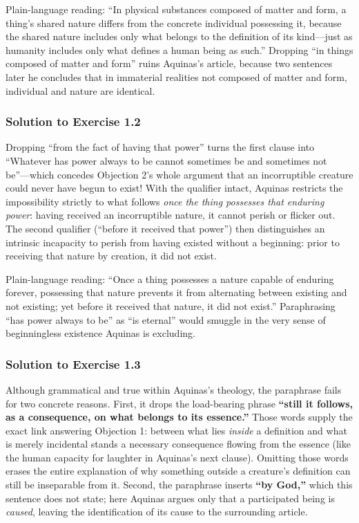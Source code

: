 Plain-language reading: ``In physical substances composed of matter and form, a thing's shared nature differs from the concrete individual possessing it, because the shared nature includes only what belongs to the definition of its kind---just as humanity includes only what defines a human being as such.'' Dropping ``in things composed of matter and form'' ruins Aquinas's article, because two sentences later he concludes that in immaterial realities not composed of matter and form, individual and nature are identical.

\subsubsection*{Solution to Exercise 1.2}
Dropping ``from the fact of having that power'' turns the first clause into ``Whatever has power always to be cannot sometimes be and sometimes not be''---which concedes Objection 2's whole argument that an incorruptible creature could never have begun to exist! With the qualifier intact, Aquinas restricts the impossibility strictly to what follows \emph{once the thing possesses that enduring power}: having received an incorruptible nature, it cannot perish or flicker out. The second qualifier (``before it received that power'') then distinguishes an intrinsic incapacity to perish from having existed without a beginning: prior to receiving that nature by creation, it did not exist.

Plain-language reading: ``Once a thing possesses a nature capable of enduring forever, possessing that nature prevents it from alternating between existing and not existing; yet before it received that nature, it did not exist.'' Paraphrasing ``has power always to be'' as ``is eternal'' would smuggle in the very sense of beginningless existence Aquinas is excluding.

\subsubsection*{Solution to Exercise 1.3}
Although grammatical and true within Aquinas's theology, the paraphrase fails for two concrete reasons. First, it drops the load-bearing phrase \textbf{``still it follows, as a consequence, on what belongs to its essence.''} Those words supply the exact link answering Objection 1: between what lies \emph{inside} a definition and what is merely incidental stands a necessary consequence flowing from the essence (like the human capacity for laughter in Aquinas's next clause). Omitting those words erases the entire explanation of why something outside a creature's definition can still be inseparable from it. Second, the paraphrase inserts \textbf{``by God,''} which this sentence does not state; here Aquinas argues only that a participated being is \emph{caused}, leaving the identification of its cause to the surrounding article.

